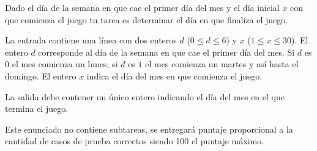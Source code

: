 \documentclass{oci}
\begin{document}
\begin{problemDescription}
  \begin{center}
  \end{center}

  Dado el día de la semana en que cae el primer día del mes y el día inicial $x$ con que comienza
  el juego tu tarea es determinar el día en que finaliza el juego.
\end{problemDescription}

\begin{inputDescription}
  La entrada contiene una línea con dos enteros $d$ ($0 \leq d \leq 6$) y $x$ ($1 \leq x \leq 30$).
  El entero $d$ corresponde al día de la semana en que cae el primer día del mes.
  Si $d$ es $0$ el mes comienza un lunes, si $d$ es $1$ el mes comienza un martes y así hasta el domingo.
  El entero $x$ indica el día del mes en que comienza el juego.
\end{inputDescription}

\begin{outputDescription}
  La salida debe contener un único entero indicando el día del mes en el que termina el juego.
\end{outputDescription}

\begin{scoreDescription}
  Este enunciado no contiene subtareas, se entregará puntaje proporcional a la cantidad de casos
  de prueba correctos siendo 100 el puntaje máximo.
\end{scoreDescription}

\begin{sampleDescription}
\end{sampleDescription}
\end{document}
